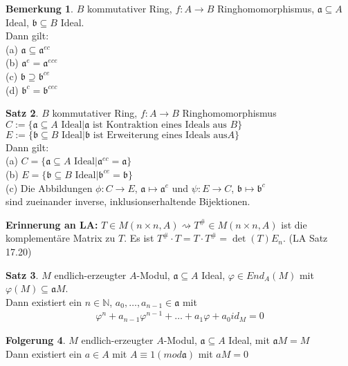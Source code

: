 \documentclass[10pt,a4paper,numbers=endperiod]{scrreprt}
\theoremstyle{definition}
\newtheorem{satz}{Satz}[section]
\newtheorem{bem}[satz]{Bemerkung}
\newtheorem{folg}[satz]{Folgerung}
\def\NN{{\mathbb N}}
\begin{document}
\begin{bem}
	$B$ kommutativer Ring, $f: A \to B$ Ringhomomorphismus, $\mathfrak{a} \subseteq A$ Ideal, $\mathfrak{b} \subseteq B$ Ideal.\\
	Dann gilt:\\
	(a) $\mathfrak{a} \subseteq \mathfrak{a}^{ec}$\\
	(b) $\mathfrak{a}^e = \mathfrak{a}^{ece}$\\
	(c) $\mathfrak{b} \supseteq \mathfrak{b}^{ce}$\\
	(d) $\mathfrak{b}^c = \mathfrak{b}^{cec}$
\end{bem}

\begin{satz}
	$B$ kommutativer Ring, $f: A \to B$ Ringhomomorphismus\\
	$C := \{\mathfrak{a} \subseteq A \text{ Ideal}|\mathfrak{a} \text{ ist Kontraktion eines Ideals aus } B\}$\\
	$E := \{\mathfrak{b} \subseteq B \text{ Ideal}| \mathfrak{b} \text{ ist Erweiterung eines Ideals aus} A\}$\\
	Dann gilt:\\
	(a) $C = \{\mathfrak{a} \subseteq A \text{ Ideal}| \mathfrak{a}^{ec} = \mathfrak{a}\}$\\
	(b) $E = \{\mathfrak{b} \subseteq B \text{ Ideal}| \mathfrak{b}^{ce} = \mathfrak{b}\}$\\
	(c) Die Abbildungen $\phi: C \to E$, $\mathfrak{a} \mapsto \mathfrak{a}^e$ und $\psi:  E \to C$, $\mathfrak{b} \mapsto \mathfrak{b}^c$\\ 
	sind zueinander inverse, inklusionserhaltende Bijektionen.
\end{satz}

\textbf{Erinnerung an LA:} $T \in M(n \times n, A) \rightsquigarrow T^\# \in M(n \times n, A)$ ist die komplementäre Matrix zu $T$. Es ist $T^\# \cdot T = T \cdot T^\# = \det(T)E_n$. (LA Satz 17.20) 

\begin{satz}
	$M$ endlich-erzeugter $A$-Modul, $\mathfrak{a} \subseteq A$ Ideal, $\varphi \in End_A(M)$ mit $\varphi(M) \subseteq \mathfrak{a}M$.\\
	Dann existiert ein $n \in \NN$, $a_0, \ldots, a_{n-1} \in \mathfrak{a}$ mit \begin{align*}
		\varphi^n + a_{n-1} \varphi^{n-1} + \ldots + a_1 \varphi + a_0 id_M = 0
	\end{align*}
\end{satz}

\begin{folg}
	$M$ endlich-erzeugter $A$-Modul, $\mathfrak{a} \subseteq A$ Ideal, mit $\mathfrak{a}M = M$\\
	Dann existiert ein $a \in A$ mit $A \equiv 1 (mod \mathfrak{a})$ mit $aM = 0$
\end{folg}
\end{document}
